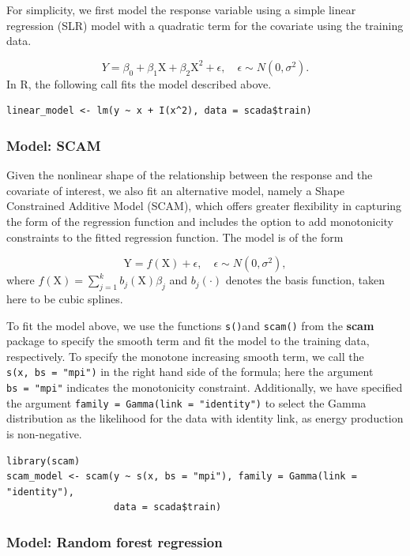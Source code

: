 For simplicity, we first model the response variable using a simple
linear regression (SLR) model with a quadratic term for the covariate
using the training data.

\[
Y  = \beta_0 + \beta_1\text{X} + \beta_2\text{X}^2 + \epsilon,\quad \epsilon\sim N(0,\sigma^2).
\] In R, the following call fits the model described above.

\begin{verbatim}
linear_model <- lm(y ~ x + I(x^2), data = scada$train)
\end{verbatim}

\subsubsection{Model: SCAM}\label{model-scam}

Given the nonlinear shape of the relationship between the response and
the covariate of interest, we also fit an alternative model, namely a
Shape Constrained Additive Model (SCAM), which offers greater
flexibility in capturing the form of the regression function and
includes the option to add monotonicity constraints to the fitted
regression function. The model is of the form

\[
\text{Y} = f(\text{X}) + \epsilon, \quad \epsilon \sim N(0,\sigma^2),
\] where \(f(\text{X}) = \sum_{j=1}^{k}b_j(\text{X})\beta_j\) and
\(b_j(\cdot)\) denotes the basis function, taken here to be cubic splines.

To fit the model above, we use the functions \texttt{s()}and \texttt{scam()} from the
\textbf{scam} package \citep{scam} to specify the smooth term and fit the model to the
training data, respectively. To specify the monotone increasing smooth
term, we call the \texttt{s(x,\ bs\ =\ "mpi")} in the right hand side of the
formula; here the argument \texttt{bs\ =\ "mpi"} indicates the monotonicity
constraint. Additionally, we have specified the argument
\texttt{family\ =\ Gamma(link\ =\ "identity")} to select the Gamma distribution as
the likelihood for the data with identity link, as energy production is
non-negative.

\begin{verbatim}
library(scam)
scam_model <- scam(y ~ s(x, bs = "mpi"), family = Gamma(link = "identity"),
                   data = scada$train)
\end{verbatim}

\subsubsection{Model: Random forest regression}\label{model-random-forest-regression}


